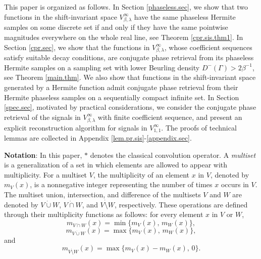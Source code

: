 \documentclass[11pt,oneside,reqno]{amsart}
\numberwithin{equation}{section}
\def\Vbeta{V^\infty_{\beta,\lambda}}
\begin{document}
  This paper is organized as follows. In Section \ref{phaseless.sec}, we show that two functions in the shift-invariant space $\Vbeta$  have the same phaseless Hermite samples on some discrete set if and only if they have the same  pointwise magnitudes everywhere on the whole real line, see Theorem \ref{cpr.sis.thm1}.  In Section \ref{cpr.sec}, we show that  the functions in $\Vbeta$,  whose coefficient sequences satisfy suitable decay
conditions, are conjugate phase retrieval from its phaseless Hermite samples on a sampling set with lower Beurling density %
$D^{-}(\Gamma)> 2\beta^{-1}$, see Theorem \ref{main.thm}. We also show that functions in the shift-invariant space generated by a Hermite function admit conjugate phase retrieval from their Hermite phaseless samples on a  sequentially compact infinite set. 
In Section \ref{spec.sec}, motivated by practical considerations,  we consider the conjugate phase retrieval of the signals in $\Vbeta$ with finite coefficient sequence, and  present an explicit reconstruction algorithm  for  signals in $V^\infty_{1,1}$. 
The proofs of 
technical lemmas are collected in Appendix \ref{lem.pr.sis}-\ref{appendix.sec}.  





\smallskip

{\bf  Notation}:  In this paper, $\ast$ denotes the classical convolution operator.
A \emph{multiset} is a generalization of  a set in which elements are allowed to appear with multiplicity.  For a multiset $V$, the multiplicity of an element $x$ in $V$, denoted by $m_V(x)$, is a nonnegative integer  representing the number of times $x$ occurs in $V$.  
The multiset union, intersection, and difference of the multisets $V$ and $W$ are denoted by
$V \dot\cup W$, $V \dot\cap W$, and $V \dot\setminus W$, respectively.
These operations are defined through their multiplicity functions as follows:
for every element $x$ in $V$ or $W$, %
\begin{equation*}
m_{V\dot\cap W}(x)
= \min\{m_V(x),\, m_W(x)\},
\end{equation*}
\begin{equation*}
m_{V\dot\cup W}(x)
= \max\{m_V(x),\, m_W(x)\},
\end{equation*}
and
\begin{equation*}
m_{V\dot\setminus W}(x)
= \max\{m_V(x)-m_W(x),\,0\}.
\end{equation*}
\end{document}
